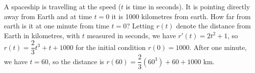{A spaceship is travelling at the speed  ($t$ is
time in seconds).  It is pointing directly away from Earth and at time $t=0$
it is 1000 kilometres from earth.  How far from earth is it at one minute from
time $t=0$?}
{Letting $r(t)$ denote the distance from Earth in kilometres, with $t$ measured in seconds, we have $r'(t) = 2t^2+1$, so $r(t) = \dfrac{2}{3}t^3+t+1000$ for the initial condition $r(0)=1000$. After one minute, we have $t=60$, so the distance is $r(60) = \dfrac{2}{3}(60^3)+60+1000$ km.}